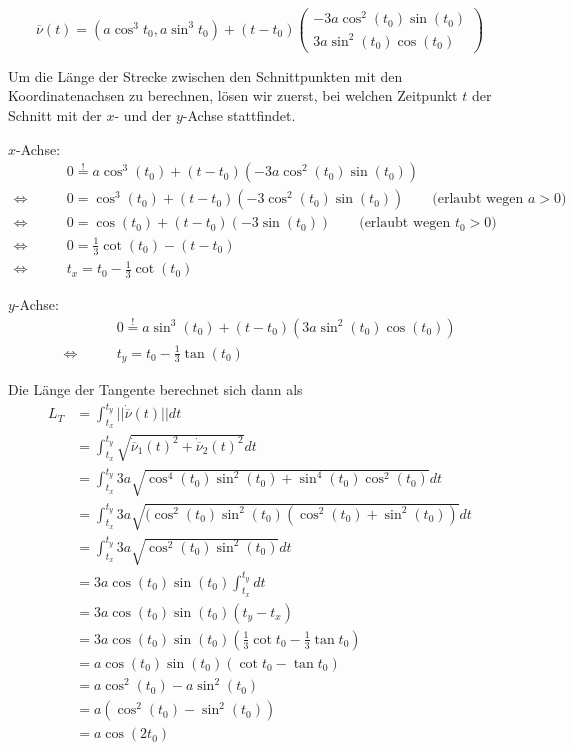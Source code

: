 \documentclass[a4paper,german,12pt,smallheadings]{scrartcl}
\begin{document}
\begin{equation*}
  \overline{\nu}(t) = (a \cos^3 t_0, a \sin^3 t_0) + (t-t_0) \begin{pmatrix} -3a \cos^2(t_0) \sin(t_0) \\ 3a \sin^2(t_0) \cos(t_0) \end{pmatrix}
\end{equation*}

Um die Länge der Strecke zwischen den Schnittpunkten mit den Koordinatenachsen
zu berechnen, lösen wir zuerst, bei welchen Zeitpunkt $t$ der Schnitt mit der
$x$- und der $y$-Achse stattfindet.

$x$-Achse:
\begin{align*}
  &0 \overset{!}{=} a \cos^3(t_0) + (t-t_0)(-3a \cos^2(t_0) \sin(t_0)) \\
  \Leftrightarrow\qquad &0 = \cos^3(t_0) + (t-t_0)(-3 \cos^2(t_0) \sin(t_0)) \qquad \text{(erlaubt wegen $a>0$)}\\
  \Leftrightarrow\qquad &0 = \cos(t_0) + (t-t_0)(-3 \sin(t_0)) \qquad \text{(erlaubt wegen $t_0 > 0$)}\\
  \Leftrightarrow\qquad &0 = \frac{1}{3} \cot(t_0) - (t - t_0) \\
  \Leftrightarrow\qquad &t_x = t_0 - \frac{1}{3} \cot(t_0)
\end{align*}

$y$-Achse:
\begin{align*}
  &0 \overset{!}{=} a \sin^3(t_0) + (t-t_0)(3a \sin^2(t_0) \cos(t_0)) \\
  \Leftrightarrow\qquad &t_y = t_0 - \frac{1}{3} \tan(t_0)
\end{align*}

Die Länge der Tangente berechnet sich dann als
\begin{align*}
  L_T &= \int_{t_x}^{t_y} ||\dot{\overline{\nu}}(t)|| dt \\
      &= \int_{t_x}^{t_y} \sqrt{\dot{\overline{\nu}}_1(t)^2 + \dot{\overline{\nu}}_2(t)^2} dt \\
      &= \int_{t_x}^{t_y} 3a \sqrt{\cos^4(t_0)\sin^2(t_0) + \sin^4(t_0) \cos^2(t_0)} dt \\
      &= \int_{t_x}^{t_y} 3a \sqrt{(\cos^2(t_0)\sin^2(t_0) (\cos^2(t_0) + \sin^2(t_0))} dt \\
      &= \int_{t_x}^{t_y} 3a \sqrt{\cos^2(t_0)\sin^2(t_0)} dt \\
      &= 3a \cos(t_0)\sin(t_0) \int_{t_x}^{t_y} dt \\
      &= 3a \cos(t_0)\sin(t_0) (t_y - t_x) \\
      &= 3a \cos(t_0)\sin(t_0) (\frac{1}{3} \cot t_0 - \frac{1}{3} \tan t_0) \\
      &= a \cos(t_0) \sin(t_0) (\cot t_0 - \tan t_0) \\
      &= a \cos^2(t_0) - a \sin^2(t_0) \\
      &= a (\cos^2(t_0) - \sin^2(t_0)) \\
      &= a \cos(2 t_0)
\end{align*}
\end{document}
